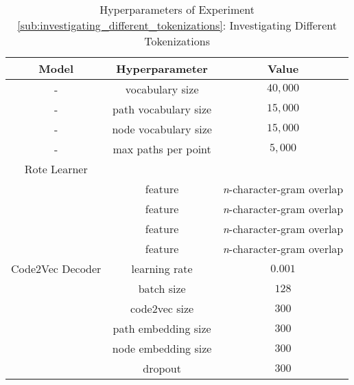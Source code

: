 \begin{table}[h!]
\begin{center}
\begin{tabular}{ c | c | c  }
    \textbf{Model}                           {}  & \textbf{Hyperparameter}  & \textbf{Value}    \\
    \hline
    -                                 & vocabulary size            & $40,000$ \\
    -                                 & path vocabulary size            & $15,000$ \\
    -                                 & node vocabulary size            & $15,000$ \\
    -                                 & max paths per point            & $5,000$ \\
    \hline
    Rote Learner                      &                             &  \\
    \hdashline
                                      & feature                    & \textit{n}-character-gram overlap \\
                                      & feature                    & \textit{n}-character-gram overlap \\
                                      & feature                    & \textit{n}-character-gram overlap \\
                                      & feature                    & \textit{n}-character-gram overlap \\
    \hline
    Code2Vec Decoder                  & learning rate              & $0.001$         \\
                                      & batch size                 & $128$           \\
                                      & code2vec size               & $300$    \\
                                      & path embedding size               & $300$    \\
                                      & node embedding size               & $300$    \\
                                      & dropout             & $300$           \\

\end{tabular}
\caption {Hyperparameters of Experiment \ref{sub:investigating_different_tokenizations}: Investigating Different Tokenizations }
\label{table:hyperparams_code2vec}
\end{center}
\end{table}

